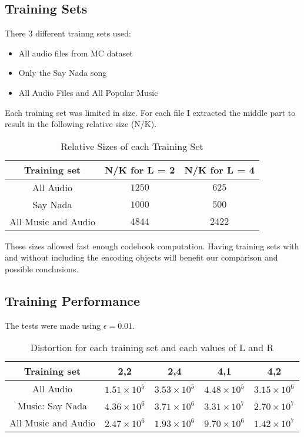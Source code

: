 \documentclass[a4paper, 11pt]{article}
\begin{document}
		
		\subsection{Training Sets}
			There 3 different trainng sets used:
			\begin{itemize}
				\item All audio files from MC dataset
				\item Only the Say Nada song
				\item All Audio Files and All Popular Music
			\end{itemize}
				
			Each training set was limited in size. 
			For each file I extracted the middle part to result in the following relative size (N/K).
				
			\begin{table}[H]
				\centering
				\begin{tabular}{c|c|c}
					\textbf{Training set} & \textbf{N/K for L = 2} 	& \textbf{N/K for L = 4} \\ \hline
					All Audio 			& $ 1250 $ 					& $ 625 $	 			 \\ \hline
					Say Nada			& $ 1000 $ 				  	& $ 500 $ \\ \hline	
					All Music and Audio & $ 4844 $					& $	2422 $ \\
				\end{tabular}
				\caption{Relative Sizes of each Training Set}
				\label{table:TrainSets}
			\end{table}
			
			These sizes allowed fast enough codebook computation.
			Having training sets with and without including the encoding objects will benefit our comparison and possible conclusions.
				
		\subsection{Training Performance}
		
			The tests were made using $ \epsilon = 0.01 $.
			\begin{table}[H]
				\centering
				\begin{tabular}{c|c|c|c|c}
					\textbf{Training set} & \textbf{2,2} 			& \textbf{2,4}			&  \textbf{4,1}				& \textbf{4,2} \\ \hline
					All Audio 			& $ 1.51 \times 10^{5} $ 	& $ 3.53 \times 10^{5} $& $4.48 \times 10^{5} $ 	& $ 3.15 \times 10^{6} $ \\ \hline
					Music: Say Nada		& $ 4.36 \times 10^{6} $ 	& $ 3.71 \times 10^{6} $& $ 3.31 \times 10^{7} $  	& $ 2.70 \times 10^{7} $ \\ \hline
					All Music and Audio & $ 2.47 \times 10^{6} $	& $	1.93 \times 10^{6}$	& $ 9.70 \times 10^{6} $	& $	1.42 \times 10^{7} $ \\
				\end{tabular}
				\caption{Distortion for each training set and each values of L and R}
				\label{table:TrainDist}
			\end{table}
			
\end{document}
